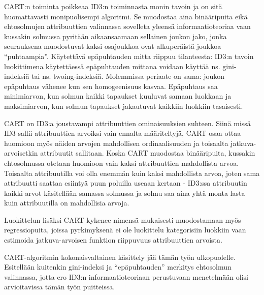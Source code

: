 \documentclass[12pt,finnish]{tktltiki2}
\theoremstyle{definition}
\theoremstyle{remark}
\begin{document}
CART:n toiminta poikkeaa ID3:n toiminnasta monin tavoin ja on sitä huomattavasti monipuolisempi algoritmi.
Se muodostaa aina binääripuita eikä ehtosolmujen attribuuttien valinnassa sovelleta yleensä informaatioteoriaa vaan
kussakin solmussa pyritään aikaansaamaan sellainen joukon jako, jonka seurauksena muodostuvat kaksi osajoukkoa ovat alkuperäistä
joukkoa ``puhtaampia''. Käytettävä epäpuhtauden mitta riippuu tilanteesta: ID3:n tavoin luokittimena käytettäessä
epäpuhtauden mittana voidaan käyttää ns. gini-indeksiä tai ns. twoing-indeksiä. Molemmissa periaate on sama:
joukon epäpuhtaus vähenee kun sen homogeenisuus kasvaa. Epäpuhtaus saa minimiarvon, kun solmun kaikki tapaukset kuuluvat samaan
luokkaan ja maksimiarvon, kun solmun tapaukset jakautuvat kaikkiin luokkiin tasaisesti.

CART on ID3:a joustavampi attribuuttien ominaisuuksien suhteen. Siinä missä ID3 sallii attribuuttien
arvoiksi vain ennalta määriteltyjä, CART osaa ottaa huomioon myös näiden arvojen mahdollisen
ordinaalisuuden ja toisaalta jatkuva-arvoisetkin attribuutit sallitaan. Koska CART muodostaa
binääripuita, kussakin ehtosolmussa otetaan huomioon vain kaksi attribuuttien mahdollista arvoa. Toisaalta
attribuutilla voi olla enemmän kuin kaksi mahdollista arvoa, joten sama attribuutti saattaa esiintyä puun
poluilla useaan kertaan - ID3:ssa attribuutin kaikki arvot käsitellään samassa solmussa ja solmu
saa aina yhtä monta lasta kuin attribuutilla on mahdollisia arvoja.

Luokittelun lisäksi CART kykenee nimensä mukaisesti muodostamaan myös regressiopuita, joissa pyrkimyksenä
ei ole luokittelu kategorisiin luokkiin vaan estimoida jatkuva-arvoisen funktion riippuvuus
attribuuttien arvoista. 

CART-algoritmin kokonaisvaltainen käsittely jää tämän työn ulkopuolelle. Esitellään kuitenkin
gini-indeksi ja ``epäpuhtauden'' merkitys ehtosolmun valinnassa, jotta ero ID3:n
informaatioteoriaan perustuvaan menetelmään olisi arvioitavissa tämän työn puitteissa.
\end{document}
